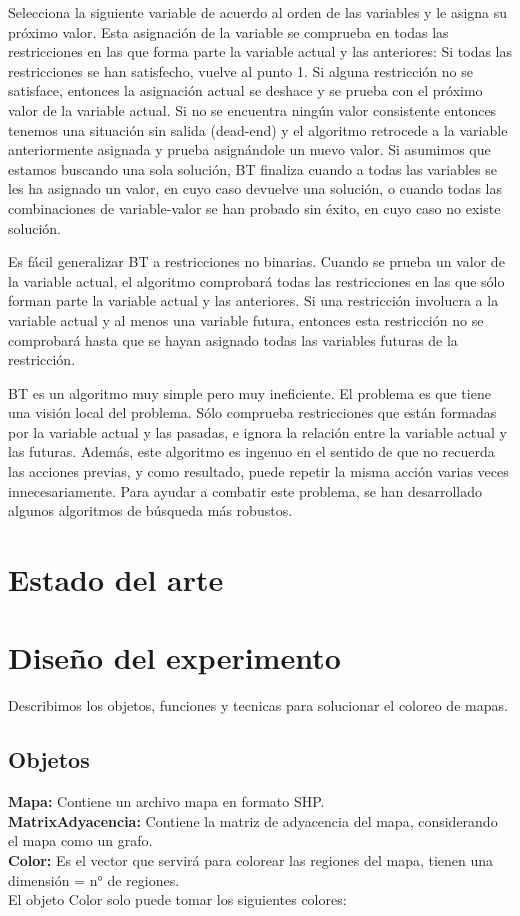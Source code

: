 \documentclass[a4paper]{article}
\begin{document}
Selecciona la siguiente variable de acuerdo al orden de las variables y le asigna su próximo valor. 
Esta asignación de la variable se comprueba en todas las restricciones en las que forma parte la variable actual y las anteriores:
Si todas las restricciones se han satisfecho, vuelve al punto 1.
Si alguna restricción no se satisface, entonces la asignación actual se deshace y se prueba con el próximo valor de la variable actual. 
Si no se encuentra ningún valor consistente entonces tenemos una situación sin salida (dead-end) y el algoritmo retrocede a la variable anteriormente asignada y prueba asignándole un nuevo valor.
Si asumimos que estamos buscando una sola solución, BT finaliza cuando a todas las variables se les ha asignado un valor, en cuyo caso devuelve una solución, o cuando todas las combinaciones de variable-valor se han probado sin éxito, en cuyo caso no existe solución.

Es fácil generalizar BT a restricciones no binarias. Cuando se prueba un valor de la variable actual, el algoritmo comprobará todas las restricciones en las que sólo forman parte la variable actual y las anteriores. Si una restricción involucra a la variable actual y al menos una variable futura, entonces esta restricción no se comprobará hasta que se hayan asignado todas las variables futuras de la restricción.

BT es un algoritmo muy simple pero muy ineficiente. El problema es que tiene una visión local del problema. Sólo comprueba restricciones que están formadas por la variable actual y las pasadas, e ignora la relación entre la variable actual y las futuras. Además, este algoritmo es ingenuo en el sentido de que no recuerda las acciones previas, y como resultado, puede repetir la misma acción varias veces innecesariamente. Para ayudar a combatir este problema, se han desarrollado algunos algoritmos de búsqueda más robustos.

 

\section{Estado del arte}


\pagebreak
\section{Diseño del experimento}
Describimos los objetos, funciones y tecnicas para solucionar el coloreo de mapas.
\subsection{Objetos}
\textbf{Mapa:} Contiene un archivo mapa en formato SHP.\\ 
\textbf{MatrixAdyacencia:} Contiene la matriz de adyacencia del mapa, considerando el mapa como un grafo.\\
\textbf{Color:} Es el vector que servirá para colorear las regiones del mapa, tienen una dimensión = n° de regiones.\\ 
El objeto Color solo puede tomar los siguientes colores:
\end{document}
